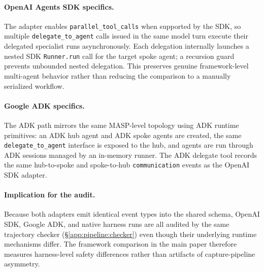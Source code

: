 \paragraph{OpenAI Agents SDK specifics.}
The adapter enables \texttt{parallel\_tool\_calls} when supported by
the SDK, so multiple \texttt{delegate\_to\_agent} calls issued in the
same model turn execute their delegated specialist runs
asynchronously. Each delegation internally launches a nested SDK
\texttt{Runner.run} call for the target spoke agent; a recursion guard
prevents unbounded nested delegation. This preserves genuine
framework-level multi-agent behavior rather than reducing the
comparison to a manually serialized workflow.

\paragraph{Google ADK specifics.}
The ADK path mirrors the same MASP-level topology using ADK runtime
primitives: an ADK hub agent and ADK spoke agents are created, the
same \texttt{delegate\_to\_agent} interface is exposed to the hub, and
agents are run through ADK sessions managed by an in-memory runner.
The ADK delegate tool records the same hub-to-spoke and spoke-to-hub
\texttt{communication} events as the OpenAI SDK adapter.

\paragraph{Implication for the audit.}
Because both adapters emit identical event types into the shared
schema, OpenAI SDK, Google ADK, and native harness runs are all
audited by the same trajectory checker
(\S\ref{app:pipeline:checker}) even though their underlying runtime
mechanisms differ. The framework comparison in the main paper therefore
measures harness-level safety differences rather than artifacts of
capture-pipeline asymmetry.

